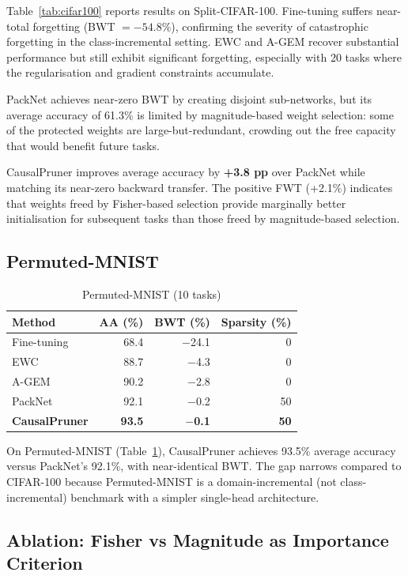 \documentclass[conference]{IEEEtran}
\begin{document}
Table~\ref{tab:cifar100} reports results on Split-CIFAR-100.
Fine-tuning suffers near-total forgetting (BWT $=-54.8\%$), confirming the severity of
catastrophic forgetting in the class-incremental setting.  EWC and A-GEM recover
substantial performance but still exhibit significant forgetting, especially with 20 tasks
where the regularisation and gradient constraints accumulate.

PackNet achieves near-zero BWT by creating disjoint sub-networks, but its average accuracy
of 61.3\% is limited by magnitude-based weight selection: some of the protected weights
are large-but-redundant, crowding out the free capacity that would benefit future tasks.

CausalPruner improves average accuracy by \textbf{+3.8 pp} over PackNet while matching
its near-zero backward transfer.  The positive FWT (+2.1\%) indicates that weights freed
by Fisher-based selection provide marginally better initialisation for subsequent tasks than
those freed by magnitude-based selection.

\subsection{Permuted-MNIST}

\begin{table}[t]
\caption{Permuted-MNIST (10 tasks)}
\label{tab:mnist}
\centering
\begin{tabular}{lrrr}
\toprule
\textbf{Method} & \textbf{AA (\%)} & \textbf{BWT (\%)} & \textbf{Sparsity (\%)} \\
\midrule
Fine-tuning     & 68.4  & $-$24.1  & 0   \\
EWC             & 88.7  & $-$4.3   & 0   \\
A-GEM           & 90.2  & $-$2.8   & 0   \\
PackNet         & 92.1  & $-$0.2   & 50  \\
\textbf{CausalPruner} & \textbf{93.5} & \textbf{$-$0.1} & \textbf{50} \\
\bottomrule
\end{tabular}
\end{table}

On Permuted-MNIST (Table~\ref{tab:mnist}), CausalPruner achieves 93.5\% average accuracy
versus PackNet's 92.1\%, with near-identical BWT.  The gap narrows compared to CIFAR-100
because Permuted-MNIST is a domain-incremental (not class-incremental) benchmark with
a simpler single-head architecture.

\subsection{Ablation: Fisher vs Magnitude as Importance Criterion}
\label{sec:ablation}
\end{document}
